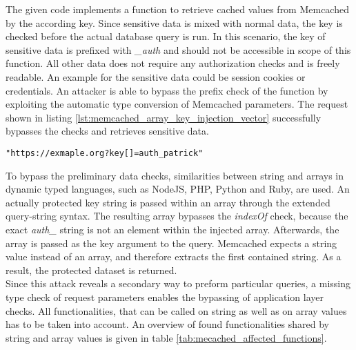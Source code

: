 The given code implements a function to retrieve cached values from Memcached by the according key. Since sensitive data is mixed with normal data, the key is checked before the actual database query is run. In this scenario, the key of sensitive data is prefixed with \emph{\_auth} and should not be accessible in scope of this function. All other data does not require any authorization checks and is freely readable. An example for the sensitive data could be session cookies or credentials. An attacker is able to bypass the prefix check of the function by exploiting the automatic type conversion of Memcached parameters. The request shown in listing \ref{lst:memcached_array_key_injection_vector} successfully bypasses the checks and retrieves sensitive data. \\

\begin{lstlisting}[caption={Attack vectors against Memcached for array key injection via the query-string parameter}, label={lst:memcached_array_key_injection_vector}]
"https://exmaple.org?key[]=auth_patrick"
\end{lstlisting}

To bypass the preliminary data checks, similarities between string and arrays in dynamic typed languages, such as NodeJS, PHP, Python and Ruby, are used. An actually protected key string is passed within an array through the extended query-string syntax. The resulting array bypasses the \emph{indexOf} check, because the exact \emph{auth\_} string is not an element within the injected array. Afterwards, the array is passed as the key argument to the query. Memcached expects a string value instead of an array, and therefore extracts the first contained string. As a result, the protected dataset is returned.\\

Since this attack reveals a secondary way to preform particular queries, a missing type check of request parameters enables the bypassing of application layer checks. All functionalities, that can be called on string as well as on array values has to be taken into account. An overview of found functionalities shared by string and array values is given in table \ref{tab:mecached_affected_functions}.

